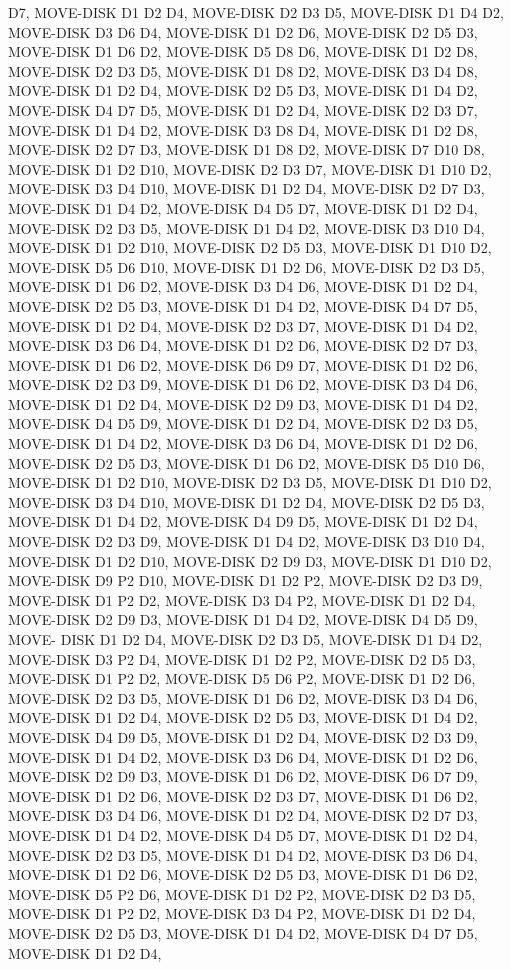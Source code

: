 \documentclass[12pt]{article}
\begin{document}
\begin{appendix}
\begin{itemize}
D7,  MOVE-DISK D1 D2 D4,  MOVE-DISK D2 D3 D5,  MOVE-DISK D1 D4 D2,  MOVE-DISK D3 D6 D4,  MOVE-DISK D1 D2 D6,  MOVE-DISK D2 D5 D3,  MOVE-DISK D1 D6 D2,  MOVE-DISK D5 D8 D6,  MOVE-DISK D1 D2 D8,  MOVE-DISK D2 D3 D5,  MOVE-DISK D1 D8 D2,  MOVE-DISK D3 D4 D8,  MOVE-DISK D1 D2 D4,  MOVE-DISK D2 D5 D3,  MOVE-DISK D1 D4 D2,  MOVE-DISK D4 D7 D5,  MOVE-DISK D1 D2 D4,  MOVE-DISK D2 D3 D7,  MOVE-DISK D1 D4 D2,  MOVE-DISK D3 D8 D4,  MOVE-DISK D1 D2 D8,  MOVE-DISK D2 D7 D3,  MOVE-DISK D1 D8 D2,  MOVE-DISK D7 D10 D8,  MOVE-DISK D1 D2 D10,  MOVE-DISK D2 D3 D7,  MOVE-DISK D1 D10 D2,  MOVE-DISK D3 D4 D10,  MOVE-DISK D1 D2 D4,  MOVE-DISK D2 D7 D3,  MOVE-DISK D1 D4 D2,  MOVE-DISK D4 D5 D7,  MOVE-DISK D1 D2 D4,  MOVE-DISK D2 D3 D5,  MOVE-DISK D1 D4 D2,  MOVE-DISK D3 D10 D4,  MOVE-DISK D1 D2 D10,  MOVE-DISK D2 D5 D3,  MOVE-DISK D1 D10 D2,  MOVE-DISK D5 D6 D10,  MOVE-DISK D1 D2 D6,  MOVE-DISK D2 D3 D5,  MOVE-DISK D1 D6 D2,  MOVE-DISK D3 D4 D6,  MOVE-DISK D1 D2 D4,  MOVE-DISK D2 D5 D3,  MOVE-DISK D1 D4 D2,  MOVE-DISK D4 D7 D5,  
MOVE-DISK D1 D2 D4,  MOVE-DISK D2 D3 D7,  MOVE-DISK D1 D4 D2,  MOVE-DISK D3 D6 D4,  MOVE-DISK D1 D2 D6,  MOVE-DISK D2 D7 D3,  MOVE-DISK D1 D6 D2,  MOVE-DISK D6 D9 D7,  MOVE-DISK D1 D2 D6,  MOVE-DISK D2 D3 D9,  MOVE-DISK D1 D6 D2,  MOVE-DISK D3 D4 D6,  MOVE-DISK D1 D2 D4,  MOVE-DISK D2 D9 D3,  MOVE-DISK D1 D4 D2,  MOVE-DISK D4 D5 D9,  MOVE-DISK D1 D2 D4,  MOVE-DISK D2 D3 D5,  MOVE-DISK D1 D4 D2,  MOVE-DISK D3 D6 D4,  MOVE-DISK D1 D2 D6,  MOVE-DISK D2 D5 D3,  MOVE-DISK D1 D6 D2,  MOVE-DISK D5 D10 D6,  MOVE-DISK D1 D2 D10,  MOVE-DISK D2 D3 D5,  MOVE-DISK D1 D10 D2,  MOVE-DISK D3 D4 D10,  MOVE-DISK D1 D2 D4,  MOVE-DISK D2 D5 D3,  MOVE-DISK D1 D4 D2,  MOVE-DISK D4 D9 D5,  MOVE-DISK D1 D2 D4,  MOVE-DISK D2 D3 D9,  MOVE-DISK D1 D4 D2,  MOVE-DISK D3 D10 D4,  MOVE-DISK D1 D2 D10,  MOVE-DISK D2 D9 D3,  MOVE-DISK D1 D10 D2,  MOVE-DISK D9 P2 D10,  MOVE-DISK D1 D2 P2,  MOVE-DISK D2 D3 D9,  MOVE-DISK D1 P2 D2,  MOVE-DISK D3 D4 P2,  MOVE-DISK D1 D2 D4,  MOVE-DISK D2 D9 D3,  MOVE-DISK D1 D4 D2,  MOVE-DISK D4 D5 D9,  MOVE-
DISK D1 D2 D4,  MOVE-DISK D2 D3 D5,  MOVE-DISK D1 D4 D2,  MOVE-DISK D3 P2 D4,  MOVE-DISK D1 D2 P2,  MOVE-DISK D2 D5 D3,  MOVE-DISK D1 P2 D2,  MOVE-DISK D5 D6 P2,  MOVE-DISK D1 D2 D6,  MOVE-DISK D2 D3 D5,  MOVE-DISK D1 D6 D2,  MOVE-DISK D3 D4 D6,  MOVE-DISK D1 D2 D4,  MOVE-DISK D2 D5 D3,  MOVE-DISK D1 D4 D2,  MOVE-DISK D4 D9 D5,  MOVE-DISK D1 D2 D4,  MOVE-DISK D2 D3 D9,  MOVE-DISK D1 D4 D2,  MOVE-DISK D3 D6 D4,  MOVE-DISK D1 D2 D6,  MOVE-DISK D2 D9 D3,  MOVE-DISK D1 D6 D2,  MOVE-DISK D6 D7 D9,  MOVE-DISK D1 D2 D6,  MOVE-DISK D2 D3 D7,  MOVE-DISK D1 D6 D2,  MOVE-DISK D3 D4 D6,  MOVE-DISK D1 D2 D4,  MOVE-DISK D2 D7 D3,  MOVE-DISK D1 D4 D2,  MOVE-DISK D4 D5 D7,  MOVE-DISK D1 D2 D4,  MOVE-DISK D2 D3 D5,  MOVE-DISK D1 D4 D2,  MOVE-DISK D3 D6 D4,  MOVE-DISK D1 D2 D6,  MOVE-DISK D2 D5 D3,  MOVE-DISK D1 D6 D2,  MOVE-DISK D5 P2 D6,  MOVE-DISK D1 D2 P2,  MOVE-DISK D2 D3 D5,  MOVE-DISK D1 P2 D2,  MOVE-DISK D3 D4 P2,  MOVE-DISK D1 D2 D4,  MOVE-DISK D2 D5 D3,  MOVE-DISK D1 D4 D2,  MOVE-DISK D4 D7 D5,  MOVE-DISK D1 D2 D4,  

\end{itemize}
\end{appendix}
\end{document}
